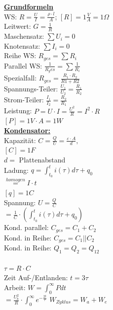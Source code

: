 \documentclass[11pt]{article}
\begin{document}

\begin{minipage}{0.45\textwidth}
\underline{\textbf{Grundformeln}}\\
WS: $R = \frac{U}{I} = \frac{\rho \cdot l}{A}$; $[R] = 1\frac{V}{A} =1 \Omega$ \\
Leitwert: $G = \frac{1}{R}$\\
Maschensatz: $\sum U_i = 0$\\
Knotensatz: $\sum I_i = 0$\\
Reihe WS: $R_{ges} = \sum R_i$\\
Parallel WS: $\frac{1}{R_ges} = \sum \frac{1}{R_i}$\\
\phantom{ss} Spezialfall: $R_{ges} = \frac{R_1 \cdot R_2}{R1+R2} $\\
Spannungs-Teiler: $\frac{U_1}{U_2} = \frac{R_1}{R_2}$\\
Strom-Teiler: $\frac{I_1}{I_2} = \frac{R_2}{R_1}$\\
Leistung: $P =U \cdot I = \frac{U^2}{R} = I^2 \cdot R $ \\
\phantom{ssssssssss} $[P] = 1V \cdot A =1 W$\\
\underline{\textbf{Kondensator:}}\\
Kapazität: $C = \frac{Q}{U} = \frac{\varepsilon \cdot A }{d},$\\
\phantom{ssssssssssii} $[C]=1F$\\
\phantom{sssssssssssii} $d =$ Plattenabstand\\
Ladung: $q = \int_{t_0}^t i(\tau) d\tau + q_0$\\
\phantom{sssssssis} $\stackrel{homogen}{=} I \cdot t$\\
\phantom{ssssssssssii} $[q]=1C$\\
Spannung: $U = \frac{Q}{C}$\\
\phantom{ssi} $= \frac{1}{C} \cdot (\int_{t_0}^t i(\tau) d\tau + q_0)$\\
Kond. parallel: $C_{ges} = C_1 + C_2$\\
Kond. in Reihe: $C_{ges} = C_1 || C_2$\\
Kond. in Reihe: $Q_1 = Q_2 = Q_{12}$\\
\\
$\tau = R \cdot C$\\
Zeit Auf-/Entlanden: $t = 3\tau$\\
Arbeit: $W = \int_0^\infty P dt$\\
\phantom{sssssssss} $= \frac{U_b^2}{R} \cdot \int_0^\infty e^{-\frac{2t}{\tau}}$
$W_{Zyklus} = W_a + W_e$\\


\end{minipage}
\end{document}
